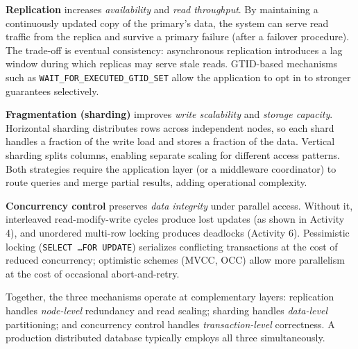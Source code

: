\documentclass[12pt,a4paper]{article}
\begin{document}
\textbf{Replication} increases \emph{availability} and \emph{read throughput}.
By maintaining a continuously updated copy of the primary's data, the system
can serve read traffic from the replica and survive a primary failure
(after a failover procedure).  The trade-off is eventual consistency:
asynchronous replication introduces a lag window during which replicas may
serve stale reads.  GTID-based mechanisms such as
\texttt{WAIT\_FOR\_EXECUTED\_GTID\_SET} allow the application to opt in to
stronger guarantees selectively.

\textbf{Fragmentation (sharding)} improves \emph{write scalability} and
\emph{storage capacity}.  Horizontal sharding distributes rows across
independent nodes, so each shard handles a fraction of the write load and
stores a fraction of the data.  Vertical sharding splits columns, enabling
separate scaling for different access patterns.  Both strategies require the
application layer (or a middleware coordinator) to route queries and merge
partial results, adding operational complexity.

\textbf{Concurrency control} preserves \emph{data integrity} under parallel
access.  Without it, interleaved read-modify-write cycles produce lost updates
(as shown in Activity 4), and unordered multi-row locking produces deadlocks
(Activity 6).  Pessimistic locking (\texttt{SELECT \ldots FOR UPDATE})
serializes conflicting transactions at the cost of reduced concurrency;
optimistic schemes (MVCC, OCC) allow more parallelism at the cost of
occasional abort-and-retry.

Together, the three mechanisms operate at complementary layers: replication
handles \emph{node-level} redundancy and read scaling; sharding handles
\emph{data-level} partitioning; and concurrency control handles
\emph{transaction-level} correctness.  A production distributed database
typically employs all three simultaneously.

\end{document}
